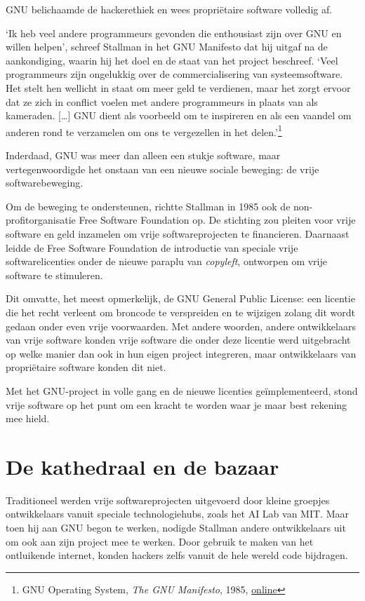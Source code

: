 \documentclass[
  a5paper,
  smalldemyvopaper,11pt,twoside,onecolumn,openright,extrafontsizes,
hidelinks]{memoir}
\begin{document}
GNU belichaamde de hackerethiek en wees propriëtaire software volledig
af.

`Ik heb veel andere programmeurs gevonden die enthousiast zijn over GNU
en willen helpen', schreef Stallman in het GNU Manifesto dat hij uitgaf
na de aankondiging, waarin hij het doel en de staat van het project
beschreef. `Veel programmeurs zijn ongelukkig over de commercialisering
van systeemsoftware. Het stelt hen wellicht in staat om meer geld te
verdienen, maar het zorgt ervoor dat ze zich in conflict voelen met
andere programmeurs in plaats van als kameraden. {[}\ldots{]} GNU dient
als voorbeeld om te inspireren en als een vaandel om anderen rond te
verzamelen om ons te vergezellen in het delen.'\footnote{\hspace{0pt}GNU
  Operating System, \emph{The GNU Manifesto}, 1985,
  \href{https://www.gnu.org/gnu/manifesto.html.en}{online}}

Inderdaad, GNU was meer dan alleen een stukje software, maar
vertegenwoordigde het onstaan van een nieuwe sociale beweging: de vrije
softwarebeweging.

Om de beweging te ondersteunen, richtte Stallman in 1985 ook de
non-profitorganisatie Free Software Foundation op. De stichting zou
pleiten voor vrije software en geld inzamelen om vrije softwareprojecten
te financieren. Daarnaast leidde de Free Software Foundation de
introductie van speciale vrije softwarelicenties onder de nieuwe paraplu
van \emph{copyleft}, ontworpen om vrije software te stimuleren.

Dit omvatte, het meest opmerkelijk, de GNU General Public License: een
licentie die het recht verleent om broncode te verspreiden en te
wijzigen zolang dit wordt gedaan onder even vrije voorwaarden. Met
andere woorden, andere ontwikkelaars van vrije software konden vrije
software die onder deze licentie werd uitgebracht op welke manier dan
ook in hun eigen project integreren, maar ontwikkelaars van propriëtaire
software konden dit niet.

Met het GNU-project in volle gang en de nieuwe licenties
geïmplementeerd, stond vrije software op het punt om een kracht te
worden waar je maar best rekening mee hield.

\section{De kathedraal en de bazaar}\label{de-kathedraal-en-de-bazaar}

Traditioneel werden vrije softwareprojecten uitgevoerd door kleine
groepjes ontwikkelaars vanuit speciale technologiehubs, zoals het AI Lab
van MIT. Maar toen hij aan GNU begon te werken, nodigde Stallman andere
ontwikkelaars uit om ook aan zijn project mee te werken. Door gebruik te
maken van het ontluikende internet, konden hackers zelfs vanuit de hele
wereld code bijdragen.
\end{document}
